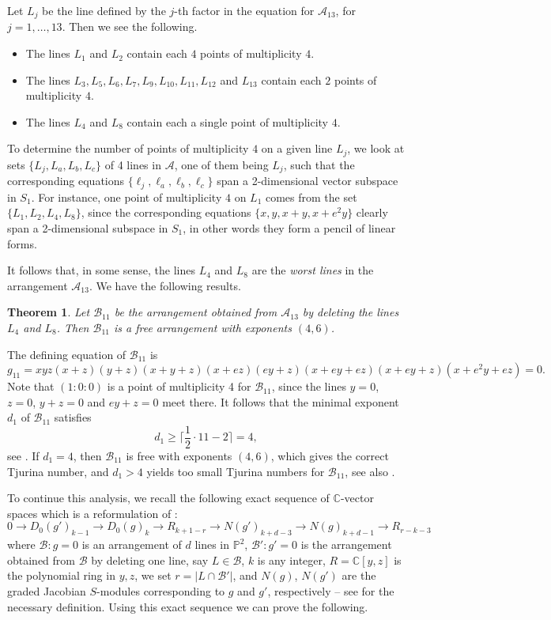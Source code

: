 \documentclass[12pt]{amsart}
\theoremstyle{plain}
\newtheorem{thm}[subsection]{Theorem}
\theoremstyle{definition}
\numberwithin{equation}{section}
\newcommand{\A}{{\mathcal A}}
\newcommand{\B}{{\mathcal B}}
\newcommand{\C}{\mathbb{C}}
\newcommand{\PP}{\mathbb{P}}
\begin{document}
Let $L_j$ be the line defined by the $j$-th factor in the equation for $\A_{13}$, for $j=1,\ldots,13$.
Then we see the following.
\begin{itemize}
\item[I1.] The lines $L_1$ and $L_2$ contain each $4$ points of multiplicity $4$.

\item[I2.] The lines $L_3, L_5,L_6,L_7,L_9,L_{10}, L_{11},L_{12} $ and $L_{13}$ contain each $2$ points of multiplicity $4$.

\item[I3.] The lines $L_4$ and $L_8$ contain each a single point of multiplicity $4$.
\end{itemize}
To determine the number of points of multiplicity $4$ on a given line $L_j$, we look at sets $\{L_j,L_a,L_b,L_c\}$ of 4 lines in $\A$, one of them being $L_j$, such that the corresponding equations $\{\ell_j,\ell_a,\ell_b,\ell_c\}$ span a 2-dimensional vector subspace in $S_1$. For instance, one point of multiplicity $4$ on $L_1$ comes from the set $\{L_1,L_2,L_4,L_8\}$,
since the corresponding equations $\{x,y,x+y,x+e^2y\}$ clearly span a 2-dimensional subspace in $S_1$, in other words they form a pencil of linear forms.

It follows that, in some sense, the lines $L_4$ and $L_8$ are the \textit{worst lines} in the arrangement $\A_{13}$. We have the following results.

\begin{thm}
\label{thm1}
Let $\B_{11}$ be the arrangement obtained from $\A_{13}$ by deleting the lines $L_4$ and $L_8$. Then $\B_{11}$ is a free arrangement with exponents $(4,6)$.
\end{thm}
\proof
The defining equation of $\B_{11}$ is
$$g_{11}=xyz(x+z)(y+z)(x+y+z)(x+ez)(ey+z)(x+ey+ez)(x+ey+z)(x+e^2y+ez)=0.$$
Note that $(1:0:0)$ is a point of multiplicity 4 for  $\B_{11}$, since the lines
$y=0$, $z=0$, $y+z=0$ and $ey+z=0$ meet there. It follows that
the minimal exponent $d_1$ of $\B_{11}$ satisfies
$$d_1 \geq \bigg\lceil\frac{1}{2}\cdot 11 - 2 \bigg\rceil = 4,$$
see \cite[Theorem 2.8]{Mich}.
If $d_1=4$, then $ \B_{11}$ is free with exponents $(4,6)$, which gives the correct Tjurina number, and $d_1 >4$ yields too small Tjurina numbers for $\B_{11}$, see also \cite[Remark 5.4]{Der}.
\endproof

To continue this analysis, we recall the following exact sequence of $\C$-vector spaces which is a reformulation of \cite[Theorem 6.2]{DIS}:
\begin{equation}
\label{eq1}
0 \to D_0(g')_{k-1} \to D_0(g)_k \to R_{k+1-r} \to N(g')_{k+d-3} \to N(g)_{k+d-1} \to R_{r-k-3}
\end{equation}
where $\B:g=0$ is an arrangement of $d$ lines in $\PP^2$, $\B':g'=0$ is the arrangement obtained from $\B$ by deleting one line, say $L \in \B$,
$k$ is any integer, $R=\C[y,z]$ is the polynomial ring in $y,z$, we set $r= |L \cap \B'|$, and $N(g)$, $N(g')$ are the graded Jacobian $S$-modules corresponding to $g$ and $g'$, respectively -- see \cite{DIS} for the necessary definition. Using this exact sequence we can prove the following.
\end{document}
